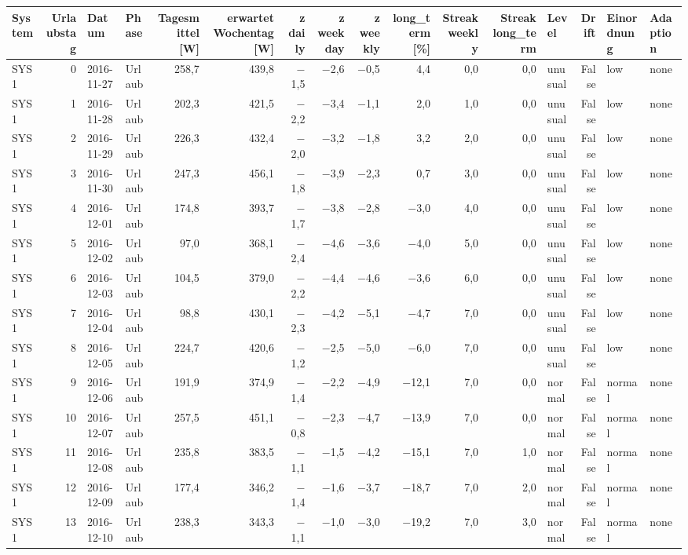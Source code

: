 \begin{tabular}{lrllrrrrrrrrlrll}
\toprule
System & Urlaubstag & Datum & Phase & Tagesmittel [W] & erwartet Wochentag [W] & z daily & z weekday & z weekly & long\_term [\%] & Streak weekly & Streak long\_term & Level & Drift & Einordnung & Adaption \\
\midrule
SYS1 & 0 & 2016-11-27 & Urlaub & 258,7 & 439,8 & $-$1,5 & $-$2,6 & $-$0,5 & 4,4 & 0,0 & 0,0 & unusual & False & low & none \\
SYS1 & 1 & 2016-11-28 & Urlaub & 202,3 & 421,5 & $-$2,2 & $-$3,4 & $-$1,1 & 2,0 & 1,0 & 0,0 & unusual & False & low & none \\
SYS1 & 2 & 2016-11-29 & Urlaub & 226,3 & 432,4 & $-$2,0 & $-$3,2 & $-$1,8 & 3,2 & 2,0 & 0,0 & unusual & False & low & none \\
SYS1 & 3 & 2016-11-30 & Urlaub & 247,3 & 456,1 & $-$1,8 & $-$3,9 & $-$2,3 & 0,7 & 3,0 & 0,0 & unusual & False & low & none \\
SYS1 & 4 & 2016-12-01 & Urlaub & 174,8 & 393,7 & $-$1,7 & $-$3,8 & $-$2,8 & $-$3,0 & 4,0 & 0,0 & unusual & False & low & none \\
SYS1 & 5 & 2016-12-02 & Urlaub & 97,0 & 368,1 & $-$2,4 & $-$4,6 & $-$3,6 & $-$4,0 & 5,0 & 0,0 & unusual & False & low & none \\
SYS1 & 6 & 2016-12-03 & Urlaub & 104,5 & 379,0 & $-$2,2 & $-$4,4 & $-$4,6 & $-$3,6 & 6,0 & 0,0 & unusual & False & low & none \\
SYS1 & 7 & 2016-12-04 & Urlaub & 98,8 & 430,1 & $-$2,3 & $-$4,2 & $-$5,1 & $-$4,7 & 7,0 & 0,0 & unusual & False & low & none \\
SYS1 & 8 & 2016-12-05 & Urlaub & 224,7 & 420,6 & $-$1,2 & $-$2,5 & $-$5,0 & $-$6,0 & 7,0 & 0,0 & unusual & False & low & none \\
SYS1 & 9 & 2016-12-06 & Urlaub & 191,9 & 374,9 & $-$1,4 & $-$2,2 & $-$4,9 & $-$12,1 & 7,0 & 0,0 & normal & False & normal & none \\
SYS1 & 10 & 2016-12-07 & Urlaub & 257,5 & 451,1 & $-$0,8 & $-$2,3 & $-$4,7 & $-$13,9 & 7,0 & 0,0 & normal & False & normal & none \\
SYS1 & 11 & 2016-12-08 & Urlaub & 235,8 & 383,5 & $-$1,1 & $-$1,5 & $-$4,2 & $-$15,1 & 7,0 & 1,0 & normal & False & normal & none \\
SYS1 & 12 & 2016-12-09 & Urlaub & 177,4 & 346,2 & $-$1,4 & $-$1,6 & $-$3,7 & $-$18,7 & 7,0 & 2,0 & normal & False & normal & none \\
SYS1 & 13 & 2016-12-10 & Urlaub & 238,3 & 343,3 & $-$1,1 & $-$1,0 & $-$3,0 & $-$19,2 & 7,0 & 3,0 & normal & False & normal & none \\

\end{tabular}
